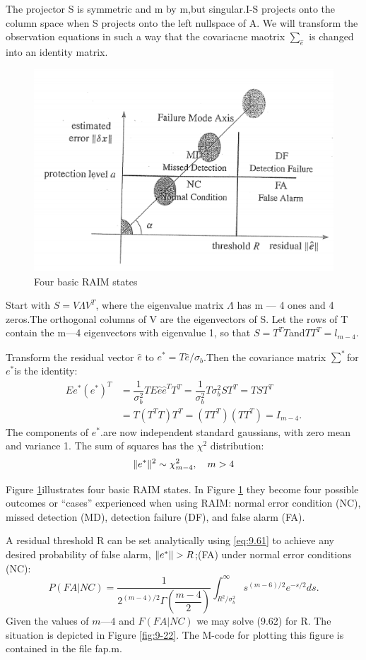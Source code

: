 		The projector S is symmetric and m by m,but singular.I-S projects onto the column space when S projects onto the left nullspace of A. We will transform the observation equations in such a way that the covariacne maotrix $\sum_{\hat{e}}$ is changed into an identity matrix.
		\begin{figure}
			\centering
			\includegraphics[width=0.7\linewidth]{TeX_files/Part03/chapter09/image/9-21}
			\caption{Four basic RAIM states}
			\label{fig:9-21}
		\end{figure}
		Start with $S = V\Lambda V^T$, where the eigenvalue matrix $\Lambda$ has m — 4 ones and 4 zeros.The orthogonal columns of V are the eigenvectors of S. Let the rows of T contain the m—4 eigenvectors with eigenvalue 1, so that $S=T^TT$and$TT^T=l_{m-4}$.
		
		Transform the residual vector $\hat{e}$ to $e^*=T\hat{e}/\sigma_b$.Then the covariance matrix $\sum^*$for $e^*$is the identity:
		\begin{align}\label{eq:9.60}
		E{e^*(e^*)^T}&=\dfrac{1}{\sigma^2_b}TE{\hat{e}\hat{e}^T}T^T=\dfrac{1}{\sigma^2_b}T\sigma^2_bST^T=TST^T \\
		&=T(T^TT)T^T=(TT^T)(TT^T)=I_{m-4}.
		\end{align}
		The components of $e^*$.are now independent standard gaussians, with zero mean and variance 1. The sum of squares has the $\chi^2$ distribution:
		\begin{equation}\label{eq:9.61}
			\Arrowvert e^* \Arrowvert^2\sim \chi^2_{m-4},\quad m>4
		\end{equation}
		
		Figure \ref{fig:9-21}illustrates four basic RAIM states. In Figure \ref{fig:9-21} they become four possible outcomes or “cases” experienced when using RAIM: normal error condition (NC), missed detection (MD), detection failure (DF), and false alarm (FA).
		
		A residual threshold R can be set analytically using \ref{eq:9.61} to achieve any desired probability of false alarm, $\Arrowvert e^*\Arrowvert > R$;(FA) under normal error conditions (NC):
		\begin{equation}\label{eq:9.62}
			P(FA|NC)=\dfrac{1}{2^{(m-4)/2}\Gamma(\dfrac{m-4}{2})}\int^\infty_{R^2/\sigma^2_b}s^{(m-6)/2}e^{-s/2}ds.
		\end{equation}
		Given the values of $m — 4$ and $F(FA|NC)$ we may solve (9.62) for R. The situation is depicted in Figure \ref{fig:9-22}. The M-code for plotting this figure is contained in the file fap.m.
		
